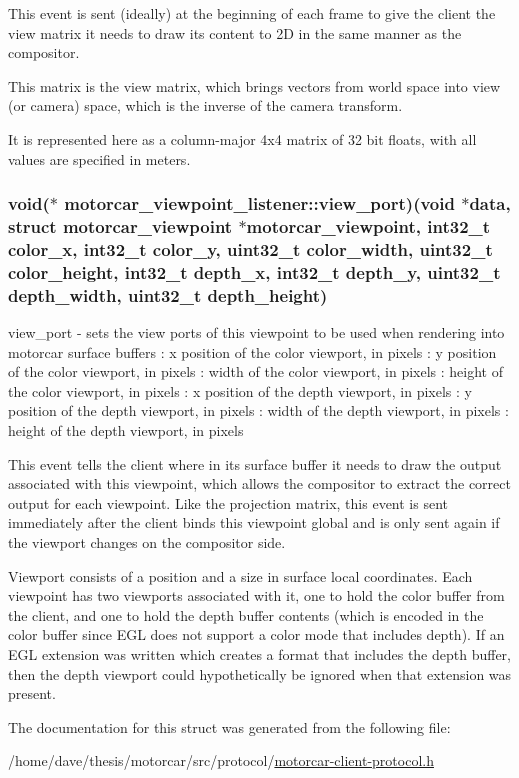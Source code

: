 This event is sent (ideally) at the beginning of each frame to give the client the view matrix it needs to draw its content to 2\-D in the same manner as the compositor.

This matrix is the view matrix, which brings vectors from world space into view (or camera) space, which is the inverse of the camera transform.

It is represented here as a column-\/major 4x4 matrix of 32 bit floats, with all values are specified in meters. \hypertarget{structmotorcar__viewpoint__listener_a0b3a306b14550df2000169a8984d925f}{
\subsubsection[{view\-\_\-port}]{\setlength{\rightskip}{0pt plus 5cm}void($\ast$ motorcar\-\_\-viewpoint\-\_\-listener\-::view\-\_\-port)(void $\ast$data, struct motorcar\-\_\-viewpoint $\ast$motorcar\-\_\-viewpoint, int32\-\_\-t color\-\_\-x, int32\-\_\-t color\-\_\-y, uint32\-\_\-t color\-\_\-width, uint32\-\_\-t color\-\_\-height, int32\-\_\-t depth\-\_\-x, int32\-\_\-t depth\-\_\-y, uint32\-\_\-t depth\-\_\-width, uint32\-\_\-t depth\-\_\-height)}}\label{structmotorcar__viewpoint__listener_a0b3a306b14550df2000169a8984d925f}
view\-\_\-port -\/ sets the view ports of this viewpoint to be used when rendering into motorcar surface buffers \-: x position of the color viewport, in pixels \-: y position of the color viewport, in pixels \-: width of the color viewport, in pixels \-: height of the color viewport, in pixels \-: x position of the depth viewport, in pixels \-: y position of the depth viewport, in pixels \-: width of the depth viewport, in pixels \-: height of the depth viewport, in pixels

This event tells the client where in its surface buffer it needs to draw the output associated with this viewpoint, which allows the compositor to extract the correct output for each viewpoint. Like the projection matrix, this event is sent immediately after the client binds this viewpoint global and is only sent again if the viewport changes on the compositor side.

Viewport consists of a position and a size in surface local coordinates. Each viewpoint has two viewports associated with it, one to hold the color buffer from the client, and one to hold the depth buffer contents (which is encoded in the color buffer since E\-G\-L does not support a color mode that includes depth). If an E\-G\-L extension was written which creates a format that includes the depth buffer, then the depth viewport could hypothetically be ignored when that extension was present. 

The documentation for this struct was generated from the following file\-:\begin{DoxyCompactItemize}
\item 
/home/dave/thesis/motorcar/src/protocol/\hyperlink{motorcar-client-protocol_8h}{motorcar-\/client-\/protocol.\-h}\end{DoxyCompactItemize}

